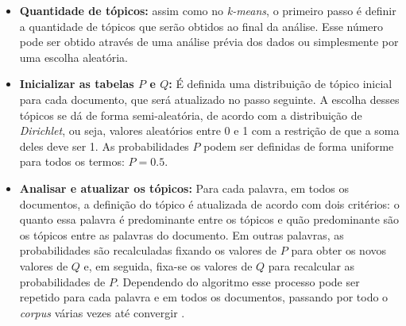 \begin{itemize}
  \item \textbf{Quantidade de tópicos:} assim como no \textit{k-means}, o primeiro passo é definir a quantidade de tópicos que serão obtidos ao final da análise. Esse número pode ser obtido através de uma análise prévia dos dados ou simplesmente por uma escolha aleatória.
  \item \textbf{Inicializar as tabelas \(P\) e \(Q\):} É definida uma distribuição de tópico inicial para cada documento, que será atualizado no passo seguinte. A escolha desses tópicos se dá de forma semi-aleatória, de acordo com a distribuição de \textit{Dirichlet}, ou seja, valores aleatórios entre 0 e 1 com a restrição de que a soma deles deve ser 1. As probabilidades \(P\) podem ser definidas de forma uniforme para todos os termos: \(P=0.5\).
  \item \textbf{Analisar e atualizar os tópicos:} Para cada palavra, em todos os documentos, a definição do tópico é atualizada de acordo com dois critérios: o quanto essa palavra é predominante  entre os tópicos e quão predominante são os tópicos entre as palavras do documento. Em outras palavras, as probabilidades são recalculadas fixando os valores de \(P\) para obter os novos valores de \(Q\) e, em seguida, fixa-se os valores de \(Q\) para recalcular as probabilidades de \(P\). Dependendo do algoritmo esse processo pode ser repetido para cada palavra e em todos os documentos, passando por todo o \textit{corpus} várias vezes até convergir \cite{annalyn}.
\end{itemize}
